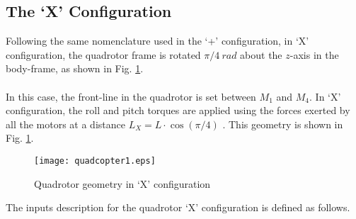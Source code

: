 \subsection{The `X' Configuration}
Following the same nomenclature used in the `+' configuration, in `X' configuration, the quadrotor frame is rotated $\pi/4\ rad$ about the $z$-axis in the body-frame, as shown in Fig. \ref{fig:quadrotorX}. 
\\\\
In this case, the front-line in the quadrotor is set between $M_1$ and $M_4$. In `X' configuration, the roll and pitch torques are applied using the forces exerted by all the motors at a distance $L_X = L\cdot \cos(\pi/4)$ \cite{Faessler2016}.  This geometry is shown in Fig. \ref{fig:quadrotorX}.
\begin{figure}[H]
\begin{center}
  \texttt{[image: quadcopter1.eps]}
\caption{Quadrotor geometry in `X' configuration} 
    \label{fig:quadrotorX}
    \end{center}
\end{figure}
The inputs description for the quadrotor `X' configuration is defined as follows.
